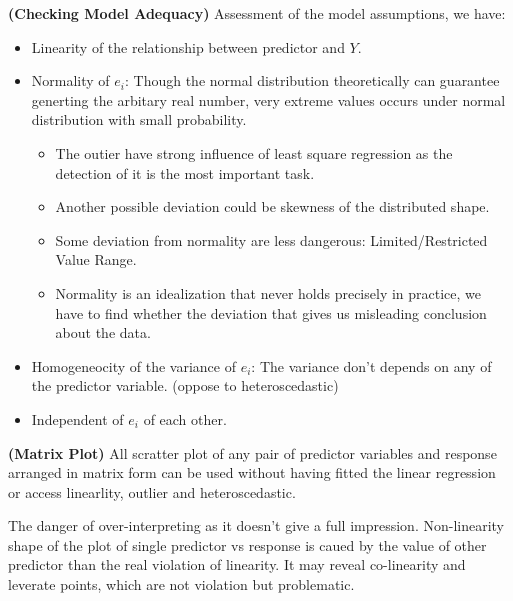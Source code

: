 \begin{remark}{\textbf{(Checking Model Adequacy)}}
    Assessment of the model assumptions, we have:
    \begin{itemize}
        \item Linearity of the relationship between predictor and $Y$. 
        \item Normality of $e_i$: Though the normal distribution theoretically can guarantee generting the arbitary real number, very extreme values occurs under normal distribution with small probability. 
        \begin{itemize}
            \item The outier have strong influence of least square regression as the detection of it is the most important task. 
            \item Another possible deviation could be skewness of the distributed shape. 
            \item Some deviation from normality are less dangerous: Limited/Restricted Value Range. 
            \item Normality is an idealization that never holds precisely in practice, we have to find whether the deviation that gives us misleading conclusion about the data. 
        \end{itemize}
        \item Homogeneocity of the variance of $e_i$: The variance don't depends on any of the predictor variable. (oppose to heteroscedastic)
        \item Independent of $e_i$ of each other. 
    \end{itemize}
\end{remark}

\begin{remark}{\textbf{(Matrix Plot)}}
    All scratter plot of any pair of predictor variables and response arranged in matrix form can be used without having fitted the linear regression or access linearlity, outlier and heteroscedastic. 

    The danger of over-interpreting as it doesn't give a full impression. Non-linearity shape of the plot of single predictor vs response is caued by the value of other predictor than the real violation of linearity. It may reveal co-linearity and leverate points, which are not violation but problematic. 
\end{remark}


